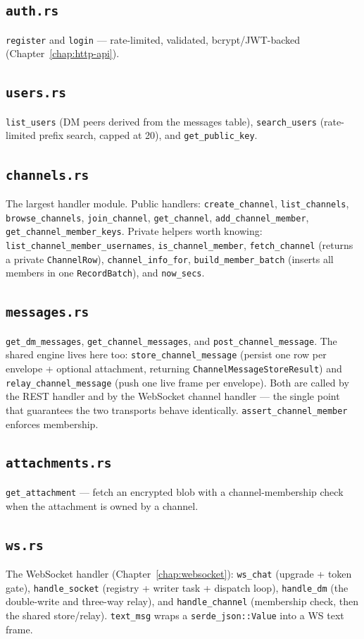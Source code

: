 \subsection*{\texttt{auth.rs}}
\verb|register| and \verb|login| --- rate-limited, validated, bcrypt/JWT-backed
(Chapter~\ref{chap:http-api}).

\subsection*{\texttt{users.rs}}
\verb|list_users| (DM peers derived from the messages table),
\verb|search_users| (rate-limited prefix search, capped at 20), and
\verb|get_public_key|.

\subsection*{\texttt{channels.rs}}
The largest handler module. Public handlers: \verb|create_channel|,
\verb|list_channels|, \verb|browse_channels|, \verb|join_channel|,
\verb|get_channel|, \verb|add_channel_member|, \verb|get_channel_member_keys|.
Private helpers worth knowing: \verb|list_channel_member_usernames|,
\verb|is_channel_member|, \verb|fetch_channel| (returns a private
\verb|ChannelRow|), \verb|channel_info_for|, \verb|build_member_batch| (inserts
all members in one \verb|RecordBatch|), and \verb|now_secs|.

\subsection*{\texttt{messages.rs}}
\verb|get_dm_messages|, \verb|get_channel_messages|, and
\verb|post_channel_message|. The shared engine lives here too:
\verb|store_channel_message| (persist one row per envelope + optional attachment,
returning \verb|ChannelMessageStoreResult|) and \verb|relay_channel_message|
(push one live frame per envelope). Both are called by the REST handler and by the
WebSocket channel handler --- the single point that guarantees the two transports
behave identically. \verb|assert_channel_member| enforces membership.

\subsection*{\texttt{attachments.rs}}
\verb|get_attachment| --- fetch an encrypted blob with a channel-membership check
when the attachment is owned by a channel.

\subsection*{\texttt{ws.rs}}
The WebSocket handler (Chapter~\ref{chap:websocket}): \verb|ws_chat| (upgrade +
token gate), \verb|handle_socket| (registry + writer task + dispatch loop),
\verb|handle_dm| (the double-write and three-way relay), and \verb|handle_channel|
(membership check, then the shared store/relay). \verb|text_msg| wraps a
\verb|serde_json::Value| into a WS text frame.

